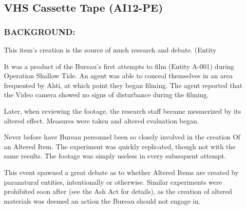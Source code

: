 \subsection*{VHS Cassette Tape (AI12-PE)}
\subsubsection*{BACKGROUND:}
\par This item's creation is the source of much research and debate.
(Entity
\par It was a product of the Bureau's first attempts to film  (Entity
A-001) during Operation Shallow Tide. An agent was able to
conceal themselves in an area frequented by Ahti, at which point
they began filming. The agent reported that the Video camera
showed no signs of disturbance during the filming.
\par Later, when reviewing the footage, the research staff became
mesmerized by its altered effect. Measures were taken and
altered evaluation began.
\par Never before have Bureau personnel been so closely involved in
the creation Of an Altered Item. The experiment was quickly
replicated, though not with the same results. The footage was
simply useless in every subsequent attempt.
\par This event spawned a great debate as to whether Altered Items
are created by paranatural entities, intentionally or otherwise.
Similar experiments were prohibited soon after (see the Ash Act
for details), as the creation of altered materials was deemed an
action the Bureau should not engage in.